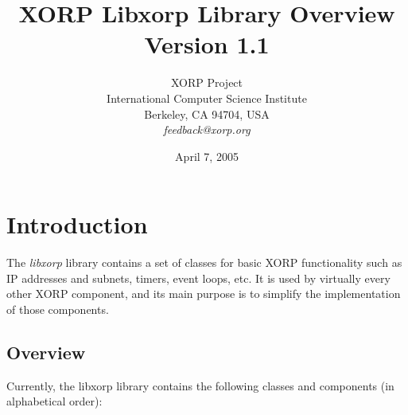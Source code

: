 \documentclass[11pt]{article}
\begin{document}
\title{XORP Libxorp Library Overview \\
\vspace{1ex}
Version 1.1}
\author{ XORP Project					\\
	 International Computer Science Institute	\\
	 Berkeley, CA 94704, USA			\\
	 {\it feedback@xorp.org}
}
\date{April 7, 2005}

\maketitle

\thispagestyle{empty}


\section{Introduction}

The \emph{libxorp} library contains a set of classes for basic
XORP functionality such as IP addresses and subnets, timers, event
loops, etc. It is used by virtually every other XORP component, and
its main purpose is to simplify the implementation of those components.

\subsection{Overview}

Currently, the libxorp library contains the following classes and
components (in alphabetical order):
\end{document}
